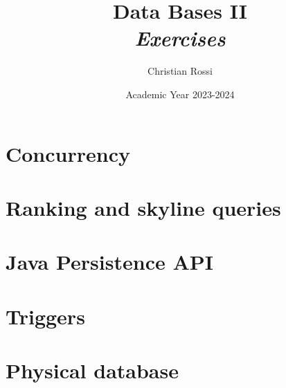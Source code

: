 \documentclass[12pt, a4paper]{report}
\title{Data Bases II \\ \textit{Exercises}}
\author{Christian Rossi}
\date{Academic Year 2023-2024}
\begin{document}
    \maketitle

    

    \cleardoublepage

    \tableofcontents

    \cleardoublepage

    \chapter{Concurrency}
    
    
    
    
    
    
    
    
    
    
    
    
    
    
    
    
    
    
    
    

    \chapter{Ranking and skyline queries}
    
    
    
    

    \chapter{Java Persistence API}
    
    
    
    

    \chapter{Triggers}
    
    
    
    

    \chapter{Physical database}
    
    
    
        
    
         
    
\end{document}
